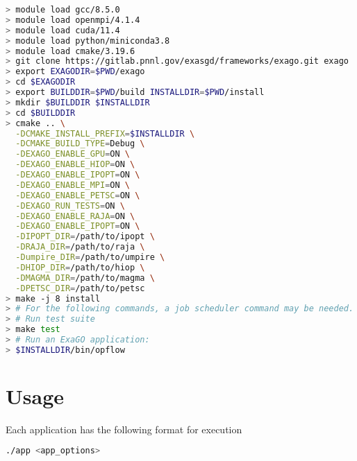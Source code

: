 \begin{lstlisting}[language=bash,caption={\exago build with all options enabled}]
> module load gcc/8.5.0
> module load openmpi/4.1.4
> module load cuda/11.4
> module load python/miniconda3.8
> module load cmake/3.19.6
> git clone https://gitlab.pnnl.gov/exasgd/frameworks/exago.git exago
> export EXAGODIR=$PWD/exago
> cd $EXAGODIR
> export BUILDDIR=$PWD/build INSTALLDIR=$PWD/install
> mkdir $BUILDDIR $INSTALLDIR
> cd $BUILDDIR
> cmake .. \
  -DCMAKE_INSTALL_PREFIX=$INSTALLDIR \
  -DCMAKE_BUILD_TYPE=Debug \
  -DEXAGO_ENABLE_GPU=ON \
  -DEXAGO_ENABLE_HIOP=ON \
  -DEXAGO_ENABLE_IPOPT=ON \
  -DEXAGO_ENABLE_MPI=ON \
  -DEXAGO_ENABLE_PETSC=ON \
  -DEXAGO_RUN_TESTS=ON \
  -DEXAGO_ENABLE_RAJA=ON \
  -DEXAGO_ENABLE_IPOPT=ON \
  -DIPOPT_DIR=/path/to/ipopt \
  -DRAJA_DIR=/path/to/raja \
  -Dumpire_DIR=/path/to/umpire \
  -DHIOP_DIR=/path/to/hiop \
  -DMAGMA_DIR=/path/to/magma \
  -DPETSC_DIR=/path/to/petsc
> make -j 8 install
> # For the following commands, a job scheduler command may be needed.
> # Run test suite
> make test
> # Run an ExaGO application:
> $INSTALLDIR/bin/opflow
\end{lstlisting}

\section{Usage}

Each \exago application has the following format for execution
\begin{lstlisting}[language=bash]
  ./app <app_options>
\end{lstlisting}


